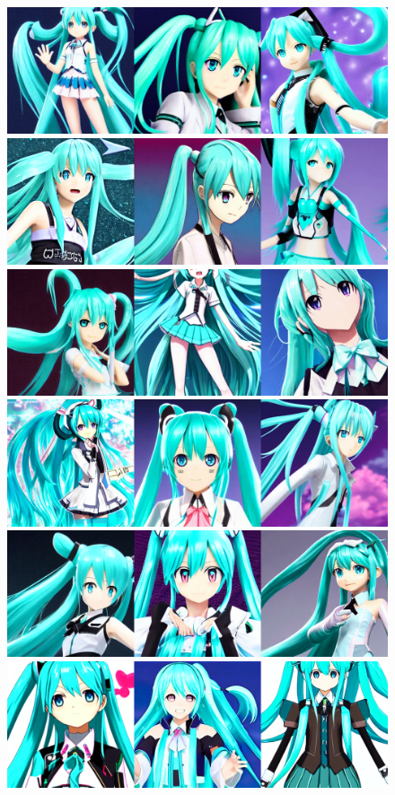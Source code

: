 \documentclass[extendedabs]{bmvc2k}
\begin{document}
\begin{figure}[t]
\centering
	\includegraphics[width=\linewidth]{images/miku0.png}
    \includegraphics[width=\linewidth]{images/miku50.png}
    \includegraphics[width=\linewidth]{images/miku100.png}
    \includegraphics[width=\linewidth]{images/miku150.png}
    \includegraphics[width=\linewidth]{images/miku200.png}
    \includegraphics[width=\linewidth]{images/miku250.png}
    

\end{figure}
\end{document}
